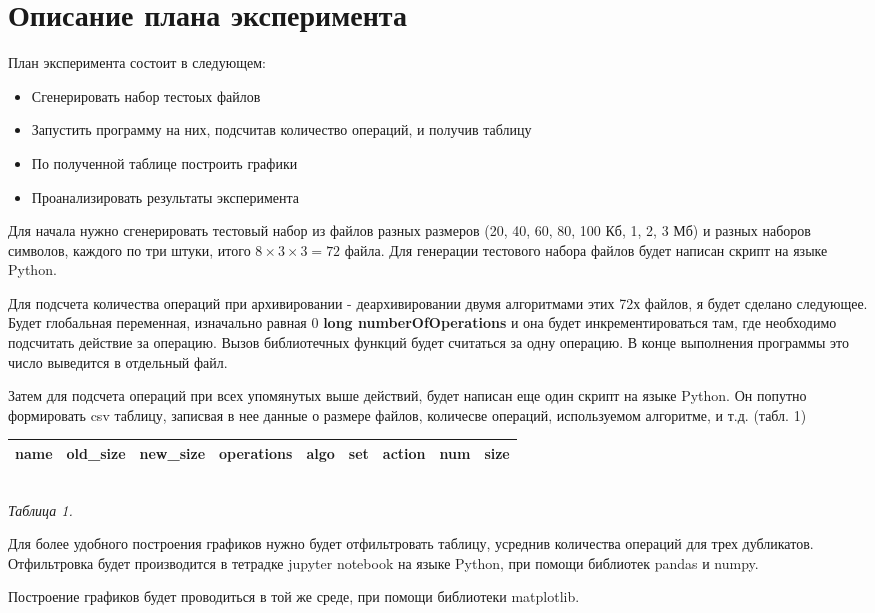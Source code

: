 \documentclass[russian, a4paper, 12pt]{article}
\begin{document}
\section{Описание плана эксперимента}
План эксперимента состоит в следующем:
\begin{itemize}
  \item Сгенерировать набор тестоых файлов
  \item Запустить программу на них, подсчитав количество операций, и получив таблицу
  \item По полученной таблице построить графики
  \item Проанализировать результаты эксперимента
\end{itemize}


Для начала нужно сгенерировать тестовый набор из файлов разных размеров
(20, 40, 60, 80, 100 Кб, 1, 2, 3 Мб) и разных наборов символов,
каждого по три штуки, итого $8\times3\times3 = 72$ файла. Для генерации тестового набора
файлов будет написан скрипт на языке Python.

Для подсчета количества операций при архивировании - деархивировании двумя алгоритмами
этих 72х файлов, я будет сделано следующее. Будет глобальная переменная, изначально равная $0$
\textbf{long numberOfOperations} и она будет инкрементироваться там, где необходимо подсчитать
действие за операцию. Вызов библиотечных функций будет считаться за одну операцию.
В конце выполнения программы это число выведится в отдельный файл.

Затем для подсчета операций при всех упомянутых выше действий, будет написан еще один
скрипт на языке Python. Он попутно формировать csv таблицу, записвая в нее данные о размере файлов,
количесве операций, используемом алгоритме, и т.д. (табл. 1)
\begin{center}
    \begin{tabular}{| l | l | l | l | l | l | l | l | l |}
    \hline
    name & old\_size & new\_size & operations & algo & set & action & num & size \\ \hline
    \end{tabular}\\
    \textit{Таблица 1.}
\end{center}

Для более удобного построения графиков нужно будет отфильтровать таблицу, усреднив количества
операций для трех дубликатов. Отфильтровка будет производится в тетрадке jupyter notebook
на языке Python, при помощи библиотек pandas и numpy.

Построение графиков будет проводиться в той же среде, при помощи библиотеки matplotlib.
\newpage
\end{document}
